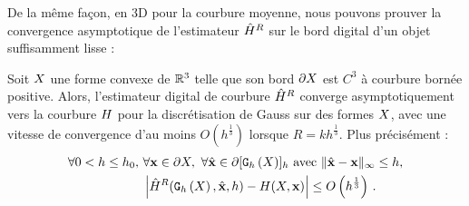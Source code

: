 De la même façon, en 3D pour la courbure moyenne, nous pouvons prouver la
convergence asymptotique de l'estimateur $\hat{H}^{R}$ sur le bord digital
d'un objet suffisamment lisse :
%
\begin{theorem}{} \label{thm:multigrid-convergence-curv-mean}
%
Soit $X$ une forme convexe de $\mathbb{R}^3$ telle que son bord $\partial X$ est $C^3$ à
courbure bornée positive. Alors, l'estimateur digital de courbure $\hat{H}^{R}$ converge
asymptotiquement vers la courbure $H$ pour la discrétisation de Gauss sur
des formes $X$, avec une vitesse de convergence d'au moins
$O(h^\frac{1}{3})$ lorsque $R = kh^\frac{1}{3}$. Plus précisément :
%
\begin{align}
  \forall 0 < h \le h_0,\,\, & \forall \mathbf{x} \in \partial X,\,\,
  \forall \hat{\mathbf{x}} \in \partial \lbrack \mathtt{G}_{h}\left(X\right) \rbrack_{h} \text{~avec~} \| \hat{\mathbf{x}} -\mathbf{x}\|_\infty \le h, \nonumber \\
  & \left| \hat{H}^{R}(\mathtt{G}_{h}\left(X\right), \hat{\mathbf{x}}, h) - H(X, \mathbf{x}) \right| \le O\left(h^{\frac{1}{3}}\right)\,.
\end{align}
%
\end{theorem}
%
